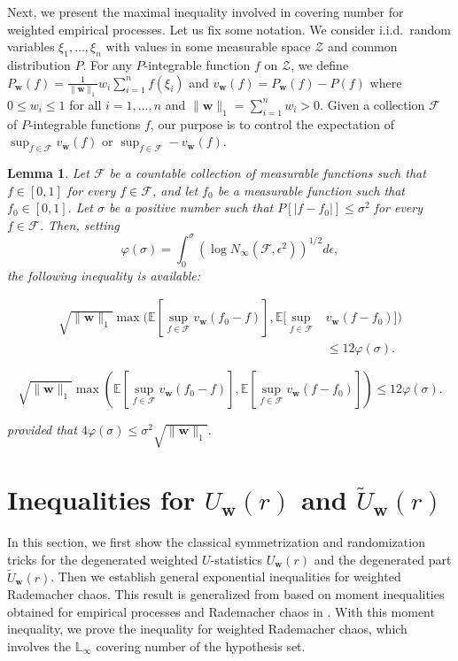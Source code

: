 \documentclass[letterpaper]{article} %
\def\DoubleColumn{}
\def\DoubleColumnEnd{}
\def\SingleColumn{}
\def\SingleColumnEnd{}
\newtheorem{lemma}{Lemma}
\newcommand{\E}{\mathbb{E}}
\newcommand{\Pro}{P}
\newcommand{\weight}{\mathbf{w}}
\newcommand{\lnorm}{\mathbb{L}}
\newcommand{\normo}[1]{\|#1\|_1}
\begin{document}
Next, we present the maximal inequality involved in covering number for weighted empirical processes. Let us fix some notation. We consider i.i.d.\ random variables $\xi_1,\dots,\xi_n$ with values in some measurable space $\mathcal{Z}$ and common distribution $P$. For any $P$-integrable function $f$ on $\mathcal{Z}$, we define $P_\weight(f)=\frac{1}{\normo{\weight{}}}w_i\sum_{i=1}^nf(\xi_i)$ and $v_\weight(f)=P_\weight(f)-P(f)$ where $0\le w_i\le 1$ for all $i=1,\dots,n$ and $\normo{\weight{}}=\sum_{i=1}^n w_i> 0$. Given a collection $\mathcal{F}$ of $P$-integrable functions $f$, our purpose is to control the expectation of $\sup_{f\in\mathcal{F}}v_\weight(f)$ or $\sup_{f\in\mathcal{F}}-v_\weight(f)$.

\begin{lemma}
\label{le:maximal_entropy_inequality}
    Let $\mathcal{F}$ be a countable collection of measurable functions such that $f\in [0,1]$ for every $f\in\mathcal{F}$, and let $f_0$ be a measurable function such that $f_0\in[0,1]$. Let $\sigma$ be a positive number such that $\Pro[|f-f_0|]\le \sigma^2$ for every $f\in\mathcal{F}$. Then, setting
    \[\varphi(\sigma)=\int_0^{\sigma} (\log N_\infty(\mathcal{F},\epsilon^2))^{1/2}d\epsilon,\]
    the following inequality is available:
    \DoubleColumn
    \begin{align*}
        \sqrt{\normo{\weight{}}}\max(\E[\sup_{f\in\mathcal{F}}v_\weight(f_0-f)],\E[\sup_{f\in\mathcal{F}} &v_\weight(f-f_0)])\\
        &\le 12\varphi(\sigma).
    \end{align*}
    \DoubleColumnEnd
    \SingleColumn
    \[\sqrt{\normo{\weight{}}}\max\left(\E[\sup_{f\in\mathcal{F}}v_\weight(f_0-f)],\E[\sup_{f\in\mathcal{F}} v_\weight(f-f_0)]\right)\le 12\varphi(\sigma).\]
    \SingleColumnEnd
    provided that $4\varphi(\sigma)\le \sigma^2\sqrt{\normo{\weight{}}}$.
\end{lemma}


\section{Inequalities for $U_\weight{}(r)$ and $\widetilde{U}_\weight{}(r)$} %
\label{sec:a_moment_inequality_for_weighted_u_processes}

In this section, we first show the classical symmetrization and randomization tricks for the degenerated weighted $U$-statistics $U_\weight{}(r)$ and the degenerated part $\widetilde{U}_\weight{}(r)$.
Then we establish general exponential inequalities for weighted Rademacher chaos.
This result is generalized from \cite{clemenccon2008ranking} based on moment inequalities obtained for empirical processes and Rademacher chaos in \cite{Boucheron2005}.
With this moment inequality, we prove the inequality for weighted Rademacher chaos, which involves the $\lnorm{}_\infty$ covering number of the hypothesis set.
\end{document}
